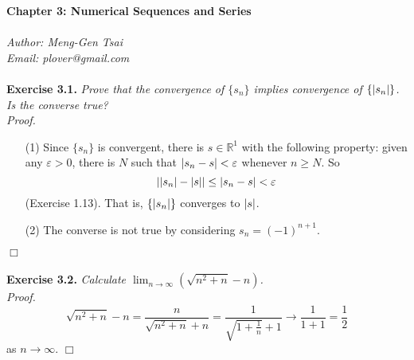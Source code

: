 \documentclass{article}
\begin{document}
\textbf{\Large Chapter 3: Numerical Sequences and Series} \\\\



\emph{Author: Meng-Gen Tsai} \\
\emph{Email: plover@gmail.com} \\\\






\textbf{Exercise 3.1.}
\emph{Prove that the convergence of $\{s_n\}$ implies
convergence of $\{\abs{s_n}\}$.  Is the converse true?} \\

\emph{Proof.}
\begin{enumerate}
\item[(1)]
Since $\{s_n\}$ is convergent, there is $s \in \mathbb{R}^1$
with the following property:
given any $\varepsilon > 0$, there is $N$ such that
$\abs{s_n - s} < \varepsilon$ whenever $n \geq N$.
So
$$\abs{\abs{s_n}-\abs{s}} \leq \abs{s_n - s}  < \varepsilon$$
(Exercise 1.13). That is,
$\{\abs{s_n}\}$ converges to $\abs{s}$.
\item[(2)]
The converse is not true by considering $s_n = (-1)^{n+1}$.
\end{enumerate}
$\Box$ \\\\






\textbf{Exercise 3.2.}
\emph{Calculate $\lim_{n \to \infty}(\sqrt{n^2 + n} - n)$.} \\

\emph{Proof.}
$$\sqrt{n^2 + n} - n
= \frac{n}{\sqrt{n^2+n} + n}
= \frac{1}{\sqrt{1+\frac{1}{n}} + 1} \to \frac{1}{1+1} = \frac{1}{2}$$
as $n \to \infty$.
$\Box$ \\
\end{document}
